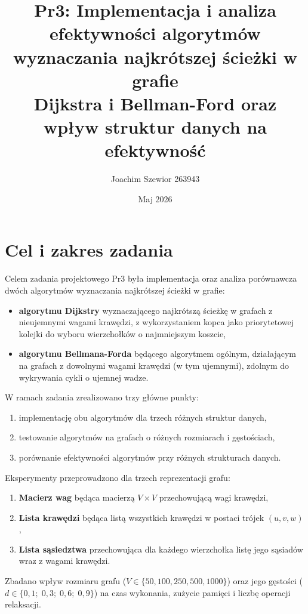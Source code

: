 \documentclass[12pt,a4paper]{article}
\title{
    \textbf{Pr3: Implementacja i analiza efektywności algorytmów} \\
    \textbf{wyznaczania najkrótszej ścieżki w grafie} \\
    \large Dijkstra i Bellman-Ford oraz wpływ struktur danych na efektywność
}
\author{Joachim Szewior 263943}
\date{Maj 2026}
\begin{document}
\maketitle
\tableofcontents
\newpage

\section{Cel i zakres zadania}

Celem zadania projektowego Pr3 była implementacja oraz analiza porównawcza dwóch algorytmów wyznaczania najkrótszej ścieżki w grafie:

\begin{itemize}
    \item \textbf{algorytmu Dijkstry} wyznaczającego najkrótszą ścieżkę w grafach z nieujemnymi wagami krawędzi, z wykorzystaniem kopca jako priorytetowej kolejki do wyboru wierzchołków o najmniejszym koszcie,
    \item \textbf{algorytmu Bellmana-Forda} będącego algorytmem ogólnym, działającym na grafach z dowolnymi wagami krawędzi (w tym ujemnymi), zdolnym do wykrywania cykli o ujemnej wadze.
\end{itemize}

W ramach zadania zrealizowano trzy główne punkty:
\begin{enumerate}
    \item implementację obu algorytmów dla trzech różnych struktur danych,
    \item testowanie algorytmów na grafach o różnych rozmiarach i gęstościach,
    \item porównanie efektywności algorytmów przy różnych strukturach danych.
\end{enumerate}

Eksperymenty przeprowadzono dla trzech reprezentacji grafu:
\begin{enumerate}
    \item \textbf{Macierz wag} będąca macierzą $V \times V$ przechowującą wagi krawędzi,
    \item \textbf{Lista krawędzi} będąca listą wszystkich krawędzi w postaci trójek $(u, v, w)$,
    \item \textbf{Lista sąsiedztwa} przechowująca dla każdego wierzchołka listę jego sąsiadów wraz z wagami krawędzi.
\end{enumerate}

Zbadano wpływ rozmiaru grafu ($V \in \{50, 100, 250, 500, 1000\}$) oraz jego gęstości ($d \in \{0{,}1;\; 0{,}3;\; 0{,}6;\; 0{,}9\}$) na czas wykonania, zużycie pamięci i liczbę operacji relaksacji.
\end{document}
